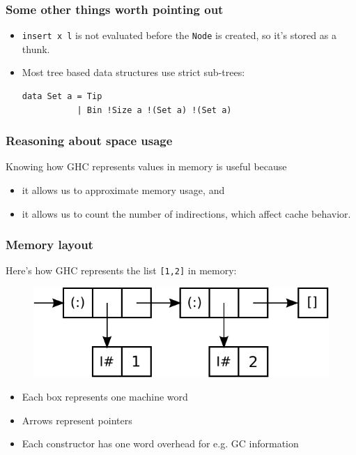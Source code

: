 \documentclass{beamer}
\begin{document}
\begin{frame}[fragile]
  \frametitle{Some other things worth pointing out}

  \begin{itemize}
  \item \lstinline!insert x l! is not evaluated before the
    \lstinline!Node! is created, so it's stored as a thunk.
  \item Most tree based data structures use strict sub-trees:
    \begin{lstlisting}
data Set a = Tip 
           | Bin !Size a !(Set a) !(Set a) 
    \end{lstlisting}
  \end{itemize}
\end{frame}


\begin{frame}[fragile]
  \frametitle{Reasoning about space usage}

  Knowing how GHC represents values in memory is useful because
  \begin{itemize}
  \item it allows us to approximate memory usage, and
  \item it allows us to count the number of indirections, which affect
    cache behavior.
  \end{itemize}
\end{frame}

\begin{frame}[fragile]
  \frametitle{Memory layout}

  Here's how GHC represents the list \lstinline![1,2]! in memory:

  \begin{figure}
    \includegraphics[scale=0.75]{diagrams/list12.pdf}
  \end{figure}

  \begin{itemize}
  \item Each box represents one machine word
  \item Arrows represent pointers
  \item Each constructor has one word overhead for e.g. GC information
  \end{itemize}
\end{frame}
\end{document}

